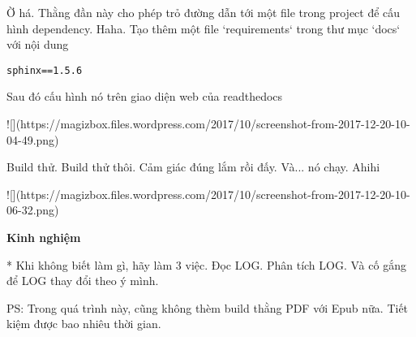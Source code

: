 Ờ há. Thằng đần này cho phép trỏ đường dẫn tới một file trong project để cấu hình dependency. Haha.
Tạo thêm một file `requirements` trong thư mục `docs` với nội dung

\begin{lstlisting}
sphinx==1.5.6
\end{lstlisting}


Sau đó cấu hình nó trên giao diện web của readthedocs

![](https://magizbox.files.wordpress.com/2017/10/screenshot-from-2017-12-20-10-04-49.png)

Build thử. Build thử thôi. Cảm giác đúng lắm rồi đấy. Và... nó chạy. Ahihi

![](https://magizbox.files.wordpress.com/2017/10/screenshot-from-2017-12-20-10-06-32.png)

\textbf{Kinh nghiệm}

* Khi không biết làm gì, hãy làm 3 việc. Đọc LOG. Phân tích LOG. Và cố gắng để LOG thay đổi theo ý mình.

PS: Trong quá trình này, cũng không thèm build thằng PDF với Epub nữa. Tiết kiệm được bao nhiêu thời gian.
